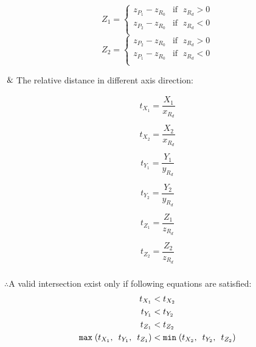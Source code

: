 \begin{multicols}{2}
\noindent
	\[
	Z_1 =
	\begin{cases}
	z_{P_1} - z_{R_0} & \text{if }\;z_{R_d} > 0\\
	z_{P_2} - z_{R_0} & \text{if }\;z_{R_d} < 0\\
	\end{cases}
	\]
\columnbreak
	\[
	Z_2 =
	\begin{cases}
	z_{P_2} - z_{R_0} & \text{if }\;z_{R_d} > 0\\
	z_{P_1} - z_{R_0} & \text{if }\;z_{R_d} < 0\\
	\end{cases}
	\]
\end{multicols}

$\And$\;\;\;\;The relative distance in different axis direction:

\begin{multicols}{3}
\noindent
	\[
	\begin{array}{lr}
	t_{X_1} = \dfrac{X_1}{x_{R_d}}\\\\
	t_{X_2} = \dfrac{X_2}{x_{R_d}}\\
	\end{array}
	\]
\columnbreak
	\[
	\begin{array}{lr}
	t_{Y_1} = \dfrac{Y_1}{y_{R_d}}\\\\
	t_{Y_2} = \dfrac{Y_2}{y_{R_d}}\\
	\end{array}
	\]
\columnbreak
	\[
	\begin{array}{lr}
	t_{Z_1} = \dfrac{Z_1}{z_{R_d}}\\\\
	t_{Z_2} = \dfrac{Z_2}{z_{R_d}}\\
	\end{array}
	\]
\end{multicols}

$\therefore$\;\;\;\;A valid intersection exist only if following equations are satisfied:
\[
\begin{array}{lr}
\begin{aligned}
t_{X_1} &< t_{X_2}\\
t_{Y_1} &< t_{Y_2}\\
t_{Z_1} &< t_{Z_2}\\
\texttt{max}\;(t_{X_1},\enspace t_{Y_1},\enspace t_{Z_1}) &< \texttt{min}\;(t_{X_2},\enspace t_{Y_2},\enspace t_{Z_2})
\end{aligned}
\end{array}
\]

